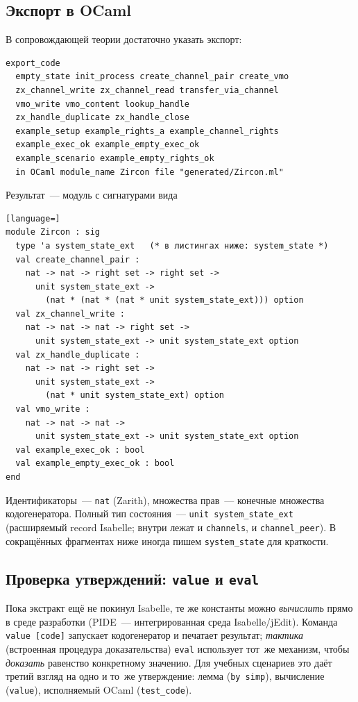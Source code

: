 \documentclass[11pt,a4paper]{article}
\begin{document}
\subsection{Экспорт в OCaml}

В сопровождающей теории достаточно указать экспорт:
\begin{lstlisting}
export_code
  empty_state init_process create_channel_pair create_vmo
  zx_channel_write zx_channel_read transfer_via_channel
  vmo_write vmo_content lookup_handle
  zx_handle_duplicate zx_handle_close
  example_setup example_rights_a example_channel_rights
  example_exec_ok example_empty_exec_ok
  example_scenario example_empty_rights_ok
  in OCaml module_name Zircon file "generated/Zircon.ml"
\end{lstlisting}
Результат~--- модуль с сигнатурами вида
\begin{lstlisting}[language=]
module Zircon : sig
  type 'a system_state_ext   (* в листингах ниже: system_state *)
  val create_channel_pair :
    nat -> nat -> right set -> right set ->
      unit system_state_ext ->
        (nat * (nat * (nat * unit system_state_ext))) option
  val zx_channel_write :
    nat -> nat -> nat -> right set ->
      unit system_state_ext -> unit system_state_ext option
  val zx_handle_duplicate :
    nat -> nat -> right set ->
      unit system_state_ext ->
        (nat * unit system_state_ext) option
  val vmo_write :
    nat -> nat -> nat ->
      unit system_state_ext -> unit system_state_ext option
  val example_exec_ok : bool
  val example_empty_exec_ok : bool
end
\end{lstlisting}
Идентификаторы~--- \texttt{nat} (Zarith), множества прав~--- конечные
множества кодогенератора. Полный тип состояния~---
\texttt{unit system\_state\_ext} (расширяемый record Isabelle; внутри
лежат и \texttt{channels}, и \texttt{channel\_peer}). В сокращённых
фрагментах ниже иногда пишем \texttt{system\_state} для краткости.

\subsection{Проверка утверждений: \texttt{value} и \texttt{eval}}

Пока экстракт ещё не покинул Isabelle, те же константы можно
\emph{вычислить} прямо в среде разработки (PIDE~--- интегрированная
среда Isabelle/jEdit). Команда \texttt{value~[code]} запускает
кодогенератор и печатает результат; \emph{тактика} (встроенная процедура
доказательства) \texttt{eval} использует тот~же механизм, чтобы
\emph{доказать} равенство конкретному значению. Для
учебных сценариев это даёт третий взгляд на одно и то~же утверждение:
лемма (\texttt{by~simp}), вычисление (\texttt{value}), исполняемый OCaml
(\texttt{test\_code}).
\end{document}
